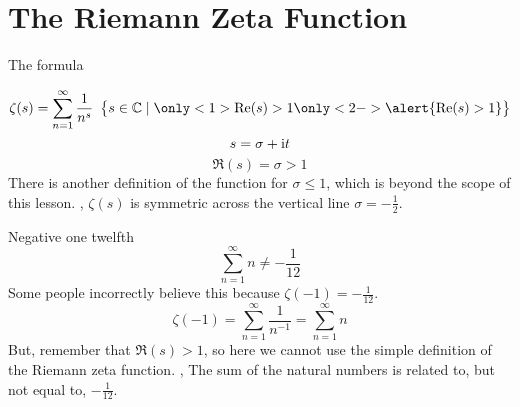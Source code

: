 \section{The Riemann Zeta Function}
\begin{namedframe}{The formula}
	\begin{definition}
		\[\zeta(s) = \sum_{n=1}^\infty \frac{1}{n^s} \restrict{s \in \complex \such \only<1>{\Re(s) > 1} \only<2->{\alert{\Re(s) > 1}}}\]
		\[s = \sigma + \mathrm{i} t\]
		\pause
		\[\Re(s) = \sigma > 1\]
		\pause
		There is another definition of the function for $\sigma \leq 1$, which is beyond the scope of this lesson.
		\sep
		$\zeta(s)$ is symmetric across the vertical line $\sigma = -\frac{1}{2}$.
	\end{definition}
\end{namedframe}
\begin{namedframe}{Negative one twelfth}
	\[\sum_{n=1}^\infty n \neq -\frac{1}{12}\]
	\pause
	Some people incorrectly believe this because $\zeta(-1) = -\frac{1}{12}$.
	\[\zeta(-1) = \sum_{n=1}^\infty \frac{1}{n^{-1}} = \sum_{n=1}^\infty n\]
	\pause
	But, remember that $\Re(s) > 1$, so here we cannot use the simple definition of the Riemann zeta function.
	\sep
	\alert{The sum of the natural numbers is related to, but not equal to, $-\frac{1}{12}$.}
\end{namedframe}
